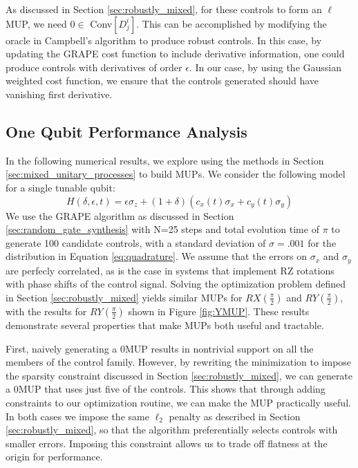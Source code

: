 \documentclass[aps,nofootinbib,pra,notitlepage,twocolumn]{revtex4-1}
\begin{document}
As discussed in Section \ref{sec:robustly_mixed}, for these controls to form an $\ell$MUP, we need $0\in $ Conv$[D_j^i]$.  This can be accomplished by modifying the oracle in Campbell's algorithm\cite{Campbell2017} to produce robust controls. In this case, by updating the GRAPE cost function to include derivative information, one could produce controls with derivatives of order $\epsilon$. In our case, by using the Gaussian weighted cost function, we ensure that the controls generated should have vanishing first derivative.

\subsection{One Qubit Performance Analysis}
\label{one_qubit_performance}
In the following numerical results, we explore using the methods in Section \ref{sec:mixed_unitary_processes} to build MUPs. We consider the following model for a single tunable qubit: 
\begin{equation}\label{eq:1Qham}
  H(\delta, \epsilon, t) = \epsilon\sigma_z + (1 + \delta)(c_x(t)\sigma_x + c_y(t)\sigma_y)
\end{equation}
We use the GRAPE algorithm as discussed in Section \ref{sec:random_gate_synthesis} with N=25 steps and total evolution time of $\pi$ to generate 100 candidate controls, with a standard deviation of $\sigma=.001$ for the distribution in Equation \ref{eq:quadrature}. We assume that the errors on $\sigma_x$ and $\sigma_y$ are perfecly correlated, as is the case in systems that implement RZ rotations with phase shifts of the control signal. Solving the optimization problem defined in Section \ref{sec:robustly_mixed} yields similar MUPs for $RX(\frac{\pi}{2})$ and $RY(\frac{\pi}{2})$, with the results for $RY(\frac{\pi}{2})$ shown in Figure \ref{fig:YMUP}. These results demonstrate several properties that make MUPs both useful and tractable.


First, naively generating a 0MUP results in nontrivial support on all the members of the control family. However, by rewriting the minimization to impose the sparsity constraint discussed in Section \ref{sec:robustly_mixed}, we can generate a 0MUP that uses just five of the controls. This shows that through adding constraints to our optimization routine, we can make the MUP practically useful. In both cases we impose the same $\ell_2$ penalty as described in Section \ref{sec:robustly_mixed}, so that the algorithm preferentially selects controls with smaller errors. Imposing this constraint allows us to trade off flatness at the origin for performance.
\end{document}
